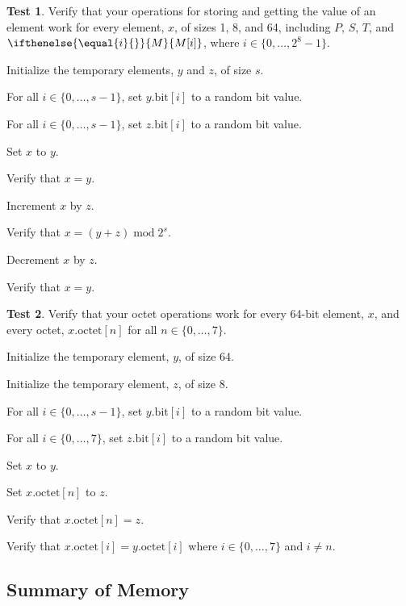 \documentclass[a4paper,12pt]{article}
\newcommand{\MEM}[1]{\ifthenelse{\equal{#1}{}}{M}{M[#1]}}
\newcommand{\PC}{P}
\newcommand{\SP}{S}
\newcommand{\TERM}{T}
\newcommand{\octno}[2]{#1.\mathrm{octet}[#2]}
\newcommand{\bitno}[2]{#1.\mathrm{bit}[#2]}
\newcommand{\range}[2]{\{#1,\ldots,#2\}}
\DeclareMathOperator{\MOD}{mod}
\newcommand{\modulo}[2]{#1 \MOD #2}
\theoremstyle{definition}
\newtheorem{test}{Test}
\begin{document}
\begin{test}
  Verify that your operations for storing and getting the value of an element work for every element, $x$, of sizes 1, 8, and 64, including $\PC$, $\SP$, $\TERM$, and $\MEM{i}$, where $i \in \range{0}{2^8-1}$.
  \begin{stepnumbers}
  \item Initialize the temporary elements, $y$ and $z$, of size $s$.
  \item For all $i \in \range{0}{s-1}$, set $\bitno{y}{i}$ to a random bit value.
  \item For all $i \in \range{0}{s-1}$, set $\bitno{z}{i}$ to a random bit value.
  \item Set $x$ to $y$.
  \item Verify that $x = y$.
  \item Increment $x$ by $z$.
  \item Verify that $x = \modulo{(y + z)}{2^s}$.
  \item Decrement $x$ by $z$.
  \item Verify that $x = y$.
  \end{stepnumbers}
\end{test}

\begin{test}
  Verify that your octet operations work for every 64-bit element, $x$, and every octet, $\octno{x}{n}$ for all $n \in \range{0}{7}$.
  \begin{stepnumbers}
  \item Initialize the temporary element, $y$, of size 64.
  \item Initialize the temporary element, $z$, of size 8.
  \item For all $i \in \range{0}{s-1}$, set $\bitno{y}{i}$ to a random bit value.
  \item For all $i \in \range{0}{7}$, set $\bitno{z}{i}$ to a random bit value.
  \item Set $x$ to $y$.
  \item Set $\octno{x}{n}$ to $z$.
  \item Verify that $\octno{x}{n} = z$.
  \item Verify that $\octno{x}{i} = \octno{y}{i}$ where $i \in \range{0}{7}$ and $i \neq n$.
  \end{stepnumbers}
\end{test}

\subsection{Summary of Memory}
\end{document}
